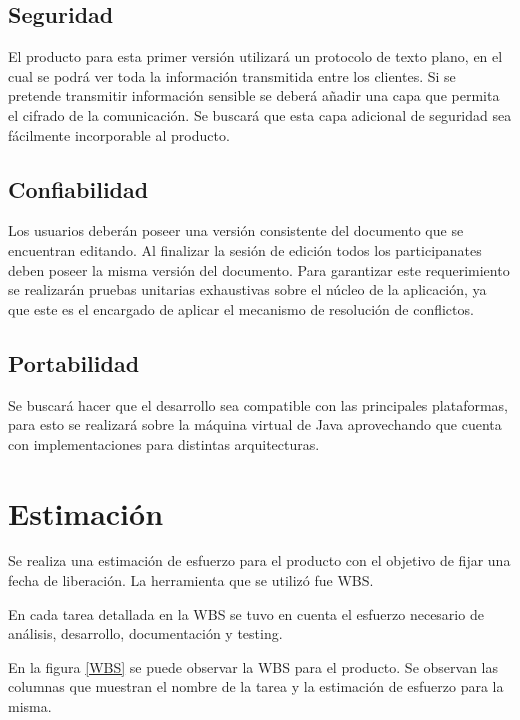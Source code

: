 \documentclass[12pt,a4paper]{article}
\begin{document}
\subsection{Seguridad} El producto para esta primer versión utilizará un protocolo de texto plano, en el cual se podrá ver toda la información transmitida entre los clientes. Si se pretende transmitir información sensible se deberá añadir una capa que permita el cifrado de la comunicación. Se buscará que esta capa adicional de seguridad sea fácilmente incorporable al producto.

\subsection{Confiabilidad} Los usuarios deberán poseer una versión consistente del documento que se encuentran editando. Al finalizar la sesión de edición todos los participanates deben poseer la misma versión del documento. Para garantizar este requerimiento se realizarán pruebas unitarias exhaustivas sobre el núcleo de la aplicación, ya que este es el encargado de aplicar el mecanismo de resolución de conflictos.

\subsection{Portabilidad} Se buscará hacer que el desarrollo sea compatible con las principales plataformas, para esto se realizará sobre la máquina virtual de Java aprovechando que cuenta con implementaciones para distintas arquitecturas.	

	\section{Estimación}

	Se realiza una estimación de esfuerzo para el producto con el objetivo de fijar una fecha de liberación. La herramienta que se utilizó fue WBS.

	En cada tarea detallada en la WBS se tuvo en cuenta el esfuerzo necesario de análisis, desarrollo, documentación y testing.

	En la figura \ref{WBS} se puede observar la WBS para el producto. Se observan las columnas que muestran el nombre de la tarea y la estimación de esfuerzo para la misma.
\end{document}
